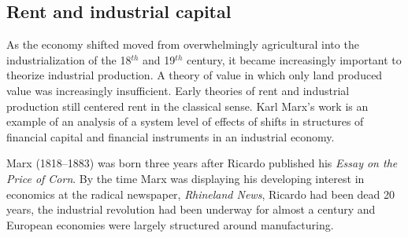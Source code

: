 \subsection{Rent and industrial capital}
As the economy shifted  moved from overwhelmingly  agricultural into the industrialization of the 18$^{th}$  and 19$^{th}$ century, it became increasingly important to theorize industrial production. A theory of value in which only land produced value was increasingly insufficient. 
Early theories of rent and industrial production still centered rent in the classical sense.
Karl Marx's work is an example of an analysis of a system level of effects of shifts in structures of financial capital and financial instruments in an industrial economy. 

Marx (1818--1883) was born three years after Ricardo published his \textit{Essay on the Price of Corn}. 
By the time Marx was displaying  his developing interest in economics  at the radical newspaper, \textit{Rhineland News}, Ricardo had been dead 20 years, the industrial revolution had been underway for almost a century and European economies were largely structured around manufacturing. 

